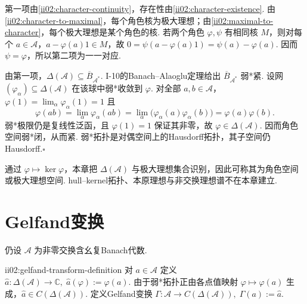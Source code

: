 \begin{FAProof}
第一项由\autoref{ii02:character-continuity}，存在性由\autoref{ii02:character-existence}. 由\autoref{ii02:character-to-maximal}，每个角色核为极大理想；由\autoref{ii02:maximal-to-character}，每个极大理想是某个角色的核. 若两个角色 \(\displaystyle\varphi,\psi\) 有相同核 \(\displaystyle M\)，则对每个 \(\displaystyle a\in\mathcal A\)，\(\displaystyle a-\varphi(a)1\in M\)，故 \(\displaystyle0=\psi(a-\varphi(a)1)=\psi(a)-\varphi(a)\). 因而 \(\displaystyle\psi=\varphi\)，所以第二项为一一对应.

由第一项，\(\displaystyle\Delta(\mathcal A)\subseteq\overline B_{\mathcal A^*}\). I-10的Banach--Alaoglu定理给出 \(\displaystyle\overline B_{\mathcal A^*}\) 弱*紧. 设网 \(\displaystyle(\varphi_\alpha)\subseteq\Delta(\mathcal A)\) 在该球中弱*收敛到 \(\displaystyle\varphi\). 对全部 \(\displaystyle a,b\in\mathcal A\)，
\(\displaystyle \varphi(1)=\lim_\alpha\varphi_\alpha(1)=1\)
且
\[
\varphi(ab)=\lim_\alpha\varphi_\alpha(ab)=\lim_\alpha\bigl(\varphi_\alpha(a)\varphi_\alpha(b)\bigr)=\varphi(a)\varphi(b).
\]
弱*极限仍是复线性泛函，且 \(\displaystyle\varphi(1)=1\) 保证其非零，故 \(\displaystyle\varphi\in\Delta(\mathcal A)\). 因而角色空间弱*闭，从而紧. 弱*拓扑是对偶空间上的Hausdorff拓扑，其子空间仍Hausdorff.\hfill\(\square\)
\end{FAProof}

通过 \(\displaystyle\varphi\mapsto\ker\varphi\)，本章把 \(\displaystyle\Delta(\mathcal A)\) 与极大理想集合识别，因此可称其为角色空间或极大理想空间. hull--kernel拓扑、本原理想与非交换理想谱不在本章建立.

\section{Gelfand变换}\label{sec:ii02-gelfand-transform}

仍设 \(\displaystyle\mathcal A\) 为非零交换含幺复Banach代数.

\begin{FADefinition}[A][Gelfand变换]{ii02:gelfand-transform-definition}
对 \(\displaystyle a\in\mathcal A\) 定义
\(\displaystyle \widehat a:\Delta(\mathcal A)\to\mathbb C, \; \widehat a(\varphi):=\varphi(a).\)
由于弱*拓扑正由各点值映射 \(\displaystyle\varphi\mapsto\varphi(a)\) 生成，\(\displaystyle\widehat a\in C(\Delta(\mathcal A))\). 定义Gelfand变换
\(\displaystyle \Gamma:\mathcal A\to C(\Delta(\mathcal A)), \; \Gamma(a):=\widehat a.\)
\end{FADefinition}

